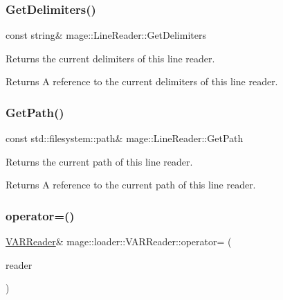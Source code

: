 \subsubsection{\texorpdfstring{Get\+Delimiters()}{GetDelimiters()}}
{\footnotesize\ttfamily const string\& mage\+::\+Line\+Reader\+::\+Get\+Delimiters\hspace{0.3cm}{\ttfamily [noexcept]}}

Returns the current delimiters of this line reader.

\begin{DoxyReturn}{Returns}
A reference to the current delimiters of this line reader. 
\end{DoxyReturn}
\mbox{\label{classmage_1_1loader_1_1_v_a_r_reader_a9740b3cecdcf5a27c696a08eef3b09da}} 
\subsubsection{\texorpdfstring{Get\+Path()}{GetPath()}}
{\footnotesize\ttfamily const std\+::filesystem\+::path\& mage\+::\+Line\+Reader\+::\+Get\+Path\hspace{0.3cm}{\ttfamily [noexcept]}}

Returns the current path of this line reader.

\begin{DoxyReturn}{Returns}
A reference to the current path of this line reader. 
\end{DoxyReturn}
\mbox{\label{classmage_1_1loader_1_1_v_a_r_reader_a78d39071ad5103c848782ff82be397bb}} 
\subsubsection{\texorpdfstring{operator=()}{operator=()}\hspace{0.1cm}{\footnotesize\ttfamily [1/2]}}
{\footnotesize\ttfamily \mbox{\hyperlink{classmage_1_1loader_1_1_v_a_r_reader}{V\+A\+R\+Reader}}\& mage\+::loader\+::\+V\+A\+R\+Reader\+::operator= (\begin{DoxyParamCaption}\item[{const \mbox{\hyperlink{classmage_1_1loader_1_1_v_a_r_reader}{V\+A\+R\+Reader}} \&}]{reader }\end{DoxyParamCaption})\hspace{0.3cm}{\ttfamily [delete]}}

